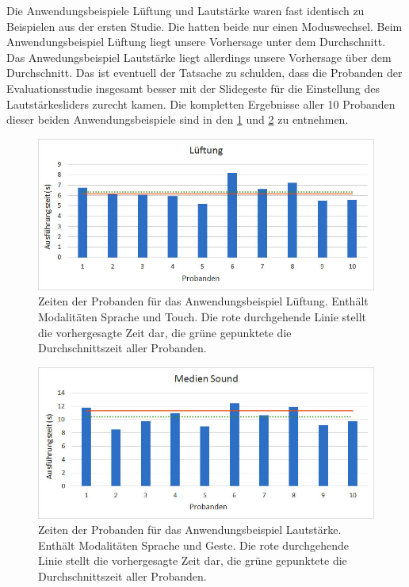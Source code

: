 Die Anwendungsbeispiele Lüftung und Lautstärke waren fast identisch zu Beispielen aus der ersten Studie. Die hatten beide nur einen Moduswechsel. Beim Anwendungsbeispiel Lüftung liegt unsere Vorhersage unter dem Durchschnitt. Das Anwedungsbeispiel Lautstärke liegt allerdings unsere Vorhersage über dem Durchschnitt. 
Das ist eventuell der Tatsache zu schulden, dass die Probanden der Evaluationsstudie insgesamt besser mit der Slidegeste für die Einstellung des Lautstärkesliders zurecht kamen. 
Die kompletten Ergebnisse aller 10 Probanden dieser beiden Anwendungsbeispiele sind in den \ref{fig:Luft_Times} und \ref{fig:MedienS_Times} zu entnehmen. 
\begin{figure}[ht]
			\centering
			\includegraphics[width=1\textwidth]{img/Luft_Times.jpg}
			\caption[Zeiten der Probanden für das Anwendungsbeispiel Lüftung.]{Zeiten der Probanden für das Anwendungsbeispiel Lüftung. Enthält Modalitäten Sprache und Touch. Die rote durchgehende Linie stellt die vorhergesagte Zeit dar, die grüne gepunktete die Durchschnittszeit aller Probanden.}
			\label{fig:Luft_Times}
\end{figure}
\begin{figure}[ht]
			\centering
			\includegraphics[width=1\textwidth]{img/Medien_S_Times.jpg}
			\caption[Zeiten der Probanden für das Anwendungsbeispiel Lautstärke.]{Zeiten der Probanden für das Anwendungsbeispiel Lautstärke. Enthält Modalitäten Sprache und Geste. Die rote durchgehende Linie stellt die vorhergesagte Zeit dar, die grüne gepunktete die Durchschnittszeit aller Probanden.}
			\label{fig:MedienS_Times}		
\end{figure}

